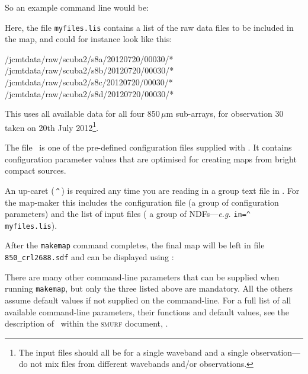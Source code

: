 So an example command line would be:

Here, the file \texttt{myfiles.lis} contains a list of the raw data
files to be included in the map, and could for instance look like this:

\begin{terminalv}
/jcmtdata/raw/scuba2/s8a/20120720/00030/*
/jcmtdata/raw/scuba2/s8b/20120720/00030/*
/jcmtdata/raw/scuba2/s8c/20120720/00030/*
/jcmtdata/raw/scuba2/s8d/20120720/00030/*
\end{terminalv}

This uses all available data for all four 850\,$\mu$m sub-arrays, for
observation 30 taken on 20th July 2012\footnote{The input files should all be
for a single waveband and a single observation---do not mix files from
different wavebands and/or observations.}.

The file \brightcompact\ is one of the pre-defined configuration files
supplied with \smurf. It contains configuration parameter values that are
optimised for creating maps from bright compact sources.

\begin{tip}
  An up-caret (\,\texttt{\^{}}\,) is required any time you are reading
  in a group text file in \starlink. For the map-maker this includes
  the configuration file (a group of configuration parameters) and the
  list of input files ( a group of NDFs---\emph{e.g.}  \texttt{in=\^{}\,myfiles.lis}).
\end{tip}

After the \texttt{makemap} command completes, the final map will be left in file
\texttt{850\_crl2688.sdf} and can be displayed using \gaia:

\begin{terminalv}
\end{terminalv}

There are many other command-line parameters that can be supplied when
running \texttt{makemap}, but only the three listed above are mandatory. All the
others assume default values if not supplied on the command-line. For a
full list of all available command-line parameters, their functions and
default values, see the description of \makemap\ within the \textsc{smurf}
document, .

